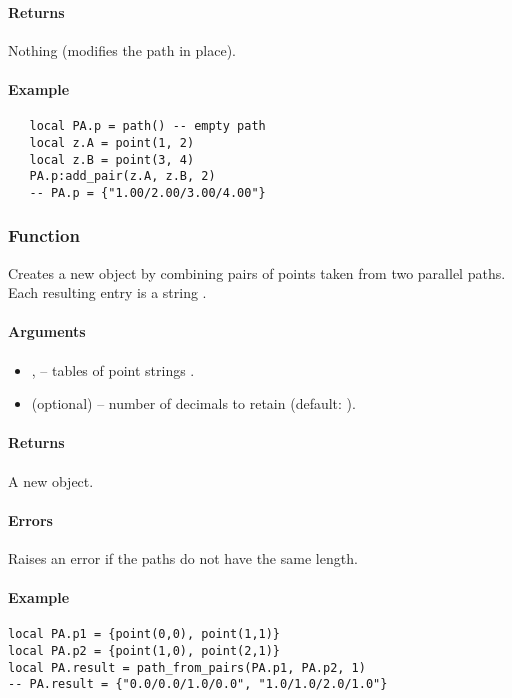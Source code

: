 \paragraph{Returns} Nothing (modifies the path in place).



\paragraph{Example}
\begin{verbatim}
   local PA.p = path() -- empty path
   local z.A = point(1, 2)
   local z.B = point(3, 4)
   PA.p:add_pair(z.A, z.B, 2)
   -- PA.p = {"1.00/2.00/3.00/4.00"}
\end{verbatim}


\subsubsection{Function }
\label{ssub:method_tkzmeth_path_path_from_pairs}

Creates a new  object by combining pairs of points taken from two parallel paths. Each resulting entry is a string .

\paragraph{Arguments}
\begin{itemize}
  \item {},  – tables of point strings .
  \item {} (optional) – number of decimals to retain (default: ).
\end{itemize}

\paragraph{Returns} A new  object.

\paragraph{Errors} Raises an error if the paths do not have the same length.

\paragraph{Example}
\begin{verbatim}
local PA.p1 = {point(0,0), point(1,1)}
local PA.p2 = {point(1,0), point(2,1)}
local PA.result = path_from_pairs(PA.p1, PA.p2, 1)
-- PA.result = {"0.0/0.0/1.0/0.0", "1.0/1.0/2.0/1.0"}
\end{verbatim}




